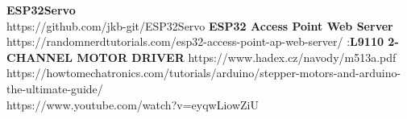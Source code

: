 \documentclass[a4paper, 11pt]{article}
\begin{document}
\clearpage
\begin{thebibliography}{9}
               {\bf ESP32Servo} \\
               https://github.com/jkb-git/ESP32Servo
                {\bf ESP32 Access Point Web Server}\\
                https://randomnerdtutorials.com/esp32-access-point-ap-web-server/
:{\bf L9110 2-CHANNEL MOTOR DRIVER} https://www.hadex.cz/navody/m513a.pdf
 \\
https://howtomechatronics.com/tutorials/arduino/stepper-motors-and-arduino-the-ultimate-guide/
\\
https://www.youtube.com/watch?v=eyqwLiowZiU
\end{thebibliography}

\end{document}
